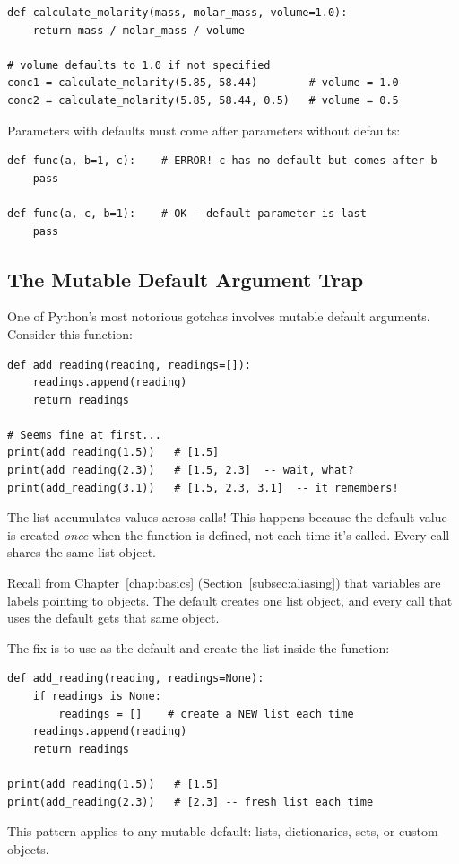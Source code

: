 \begin{lstlisting}
def calculate_molarity(mass, molar_mass, volume=1.0):
    return mass / molar_mass / volume

# volume defaults to 1.0 if not specified
conc1 = calculate_molarity(5.85, 58.44)        # volume = 1.0
conc2 = calculate_molarity(5.85, 58.44, 0.5)   # volume = 0.5
\end{lstlisting}

\begin{warning}
Parameters with defaults must come after parameters without defaults:
\begin{lstlisting}
def func(a, b=1, c):    # ERROR! c has no default but comes after b
    pass

def func(a, c, b=1):    # OK - default parameter is last
    pass
\end{lstlisting}
\end{warning}

\subsection{The Mutable Default Argument Trap}
\label{subsec:mutable-defaults}

One of Python's most notorious gotchas involves mutable default arguments. Consider this function:

\begin{lstlisting}
def add_reading(reading, readings=[]):
    readings.append(reading)
    return readings

# Seems fine at first...
print(add_reading(1.5))   # [1.5]
print(add_reading(2.3))   # [1.5, 2.3]  -- wait, what?
print(add_reading(3.1))   # [1.5, 2.3, 3.1]  -- it remembers!
\end{lstlisting}

The list accumulates values across calls! This happens because the default value \py{[]} is created \emph{once} when the function is defined, not each time it's called. Every call shares the same list object.

Recall from Chapter~\ref{chap:basics} (Section~\ref{subsec:aliasing}) that variables are labels pointing to objects. The default \py{[]} creates one list object, and every call that uses the default gets that same object.

\begin{tip}
The fix is to use  as the default and create the list inside the function:
\begin{lstlisting}
def add_reading(reading, readings=None):
    if readings is None:
        readings = []    # create a NEW list each time
    readings.append(reading)
    return readings

print(add_reading(1.5))   # [1.5]
print(add_reading(2.3))   # [2.3] -- fresh list each time
\end{lstlisting}
This pattern applies to any mutable default: lists, dictionaries, sets, or custom objects.
\end{tip}


